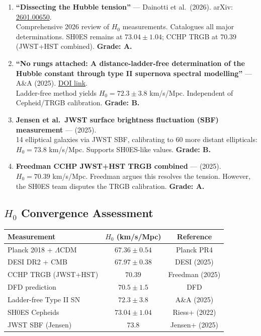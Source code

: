\documentclass[11pt,a4paper]{article}
\begin{document}
\begin{enumerate}
\item \textbf{``Dissecting the Hubble tension''} --- Dainotti et al.\ (2026). arXiv: \href{https://arxiv.org/abs/2601.00650}{2601.00650}.\\
Comprehensive 2026 review of $H_0$ measurements. Catalogues all major determinations. SH0ES remains at $73.04 \pm 1.04$; CCHP TRGB at $70.39$ (JWST+HST combined). \textbf{Grade: A.}

\item \textbf{``No rungs attached: A distance-ladder-free determination of the Hubble constant through type II supernova spectral modelling''} --- A\&A (2025). \href{https://www.aanda.org/articles/aa/full_html/2025/10/aa52910-24/aa52910-24.html}{DOI link}.\\
Ladder-free method yields $H_0 = 72.3 \pm 3.8$ km/s/Mpc. Independent of Cepheid/TRGB calibration. \textbf{Grade: B.}

\item \textbf{Jensen et al.\ JWST surface brightness fluctuation (SBF) measurement} --- (2025).\\
14 elliptical galaxies via JWST SBF, calibrating to 60 more distant ellipticals: $H_0 = 73.8$ km/s/Mpc. Supports SH0ES-like values. \textbf{Grade: B.}

\item \textbf{Freedman CCHP JWST+HST TRGB combined} --- (2025).\\
$H_0 = 70.39$ km/s/Mpc. Freedman argues this resolves the tension. However, the SH0ES team disputes the TRGB calibration. \textbf{Grade: A.}
\end{enumerate}

\subsection{$H_0$ Convergence Assessment}

\begin{center}
\begin{tabular}{lcc}
\toprule
\textbf{Measurement} & $H_0$ (km/s/Mpc) & \textbf{Reference} \\
\midrule
Planck 2018 + $\Lambda$CDM & $67.36 \pm 0.54$ & Planck PR4 \\
DESI DR2 + CMB & $67.97 \pm 0.38$ & DESI (2025) \\
CCHP TRGB (JWST+HST) & $70.39$ & Freedman (2025) \\
DFD prediction & $70.5 \pm 1.5$ & DFD \\
Ladder-free Type II SN & $72.3 \pm 3.8$ & A\&A (2025) \\
SH0ES Cepheids & $73.04 \pm 1.04$ & Riess+ (2022) \\
JWST SBF (Jensen) & $73.8$ & Jensen+ (2025) \\
\bottomrule
\end{tabular}
\end{center}
\end{document}
